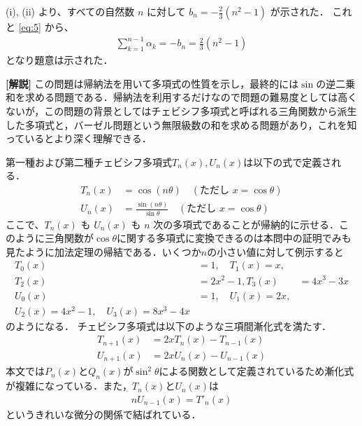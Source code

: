 \documentclass[a4paper,10pt]{ltjsarticle}
\begin{document}
\begin{multicols}{2}
\vspace{10pt}

(i), (ii) より、すべての自然数 $n$ に対して $b_n = -\frac{2}{3}(n^2 - 1)$ が示された．
これと \cref{eq:5} から、
\begin{align*}
\sum_{k=1}^{n-1} \alpha_k = -b_n = \frac{2}{3}(n^2-1)
  \end{align*}
となり題意は示された．

\vspace{10pt}
{\bf[解説]}
この問題は帰納法を用いて多項式の性質を示し，最終的には$\sin$の逆二乗和を求める問題である．帰納法を利用するだけなので問題の難易度としては高くないが，この問題の背景としてはチェビシフ多項式と呼ばれる三角関数から派生した多項式と，バーゼル問題という無限級数の和を求める問題があり，これを知っているとより深く理解できる．

第一種および第二種チェビシフ多項式$T_n(x), U_n(x)$は以下の式で定義される．
\begin{align*}
    T_n(x) &= \cos(n\theta) \quad (\text{ただし } x = \cos\theta) \\
    U_n(x) &= \frac{\sin(n\theta)}{\sin\theta} \quad (\text{ただし } x = \cos\theta)
\end{align*}
ここで、$T_n(x)$ も $U_n(x)$ も $n$ 次の多項式であることが帰納的に示せる．このように三角関数が$\cos\theta$に関する多項式に変換できるのは本問中の証明でみも見たように加法定理の帰結である．いくつか$n$の小さい値に対して例示すると
\begin{align*}
    T_0(x) &= 1, \quad T_1(x) = x, \\
    T_2(x) &= 2x^2 - 1, T_3(x) &= 4x^3 - 3x \\
    U_0(x) &= 1, \quad U_1(x) = 2x, \\
    U_2(x) = 4x^2 - 1, \quad U_3(x) = 8x^3 - 4x
\end{align*}
のようになる．
チェビシフ多項式は以下のような三項間漸化式を満たす．
\begin{align*}
    T_{n+1}(x) &= 2xT_n(x) - T_{n-1}(x) \\
    U_{n+1}(x) &= 2xU_n(x) - U_{n-1}(x)
\end{align*}
本文では$P_n(x)$と$Q_n(x)$が$\sin^{2}\theta$による関数として定義されているため漸化式が複雑になっている．また，$T_n(x)$と$U_n(x)$は
\begin{align*}
    nU_{n-1}(x) = T'_n(x)
\end{align*}
というきれいな微分の関係で結ばれている．


\end{multicols}
\end{document}
